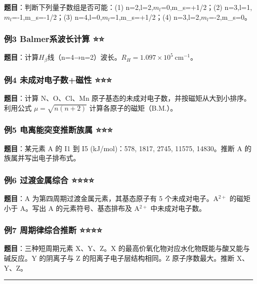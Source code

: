 \documentclass[a4paper,11pt]{ctexart}
\begin{document}
\textbf{题目}：判断下列量子数组是否可能：(1) n=2,l=2,\(m_l\)=0,m\_s=+1/2；(2) n=3,l=1,\(m_l\)=-1,m\_s=-1/2；(3) n=4,l=0,\(m_l\)=1,m\_s=+1/2；(4) n=3,l=2,\(m_l\)=-2,m\_s=0。

\subsubsection{例3 Balmer系波长计算 ⭐⭐}\label{ux4f8b3-balmerux7cfbux6ce2ux957fux8ba1ux7b97}

\textbf{题目}：计算\(H_\beta\)线（n=4→n=2）波长。\(R_H=1.097\times10^5\ \mathrm{cm^{-1}}\)。

\subsubsection{例4 未成对电子数+磁性 ⭐⭐⭐}\label{ux4f8b4-ux672aux6210ux5bf9ux7535ux5b50ux6570ux78c1ux6027}

\textbf{题目}：计算 N、O、Cl、Mn 原子基态的未成对电子数，并按磁矩从大到小排序。利用公式 \(\mu = \sqrt{n(n+2)}\) 计算各原子的磁矩（B.M.）。

\subsubsection{例5 电离能突变推断族属 ⭐⭐⭐}\label{ux4f8b5-ux7535ux79bbux80fdux7a81ux53d8ux63a8ux65adux65cfux5c5e}

\textbf{题目}：某元素 A 的 I1 到 I5 (kJ/mol)：578, 1817, 2745, 11575, 14830。推断 A 的族属并写出电子排布式。

\subsubsection{例6 过渡金属综合 ⭐⭐⭐⭐}\label{ux4f8b6-ux8fc7ux6e21ux91d1ux5c5eux7efcux5408}

\textbf{题目}：A 为第四周期过渡金属元素，其基态原子有 5 个未成对电子。A\(^{2+}\) 的磁矩小于 A。写出 A 的元素符号、基态排布及 A\(^{2+}\) 中未成对电子数。

\subsubsection{例7 周期律综合推断 ⭐⭐⭐⭐}\label{ux4f8b7-ux5468ux671fux5f8bux7efcux5408ux63a8ux65ad}

\textbf{题目}：三种短周期元素 X、Y、Z。X 的最高价氧化物对应水化物既能与酸又能与碱反应。Y 的阴离子与 Z 的阳离子电子层结构相同。Z 原子序数最大。推断 X、Y、Z。

\begin{center}\rule{0.5\linewidth}{0.5pt}\end{center}
\end{document}
